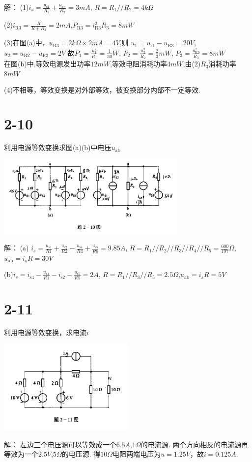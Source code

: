 \documentclass{article}
\begin{document}
\noindent 解：
(1)$i_s=\frac{u_\text{s1}}{R_1}+\frac{u_\text{s=}}{R_2}=3mA$,
$R=R_1//R_2=4k\Omega$

(2)$i_\text{R3}=\frac{R}{R+R_3}=2mA$,$P_\text{R3}=i_\text{R3}^2R_3=8mW$

(3)在图(a)中，$u_\text{R3}=2k\Omega\times2mA=4V$,则
$u_1=u_\text{s1}-u_\text{R3}=20V$,$u_2=u_\text{R2}-u_\text{R3}=2V$
故$P_1=\frac{u_1^2}{R_1}=\frac{1}{30}W$,
$P_2=\frac{u_2^2}{R_2}=\frac{2}{3}mW$,
$P_3=\frac{u_\text{R3}^2}{R_3}=8mW$\\
在图(b)中,等效电源发出功率$12mW$,等效电阻消耗功率$4mW$,由(2)$R_3$消耗功率$8mW$

(4)不相等，等效变换是对外部等效，被变换部分内部不一定等效.
\section*{2-10}
利用电源等效变换求图(a)(b)中电压$u_\text{ab}$
\begin{center}
\includegraphics[width=0.7\textwidth,height=0.2\textheight]{2-10.jpg}
\end{center}

\noindent 解：
(a)
$i_s=\frac{u_\text{s1}}{R1}+\frac{u_\text{s2}}{R2}
-\frac{u_\text{s4}}{R4}+\frac{u_\text{s5}}{R5}=9.85A$,
$R=R_1//R_2//R_3//R_4//R_5=\frac{600}{197}\Omega$,
$u_\text{ab}=i_sR=30V$

(b)$i_s=i_\text{s4}-\frac{u_\text{s1}}{R1}-i_\text{s2}-\frac{u_\text{s5}}{R5}=2A$,
$R=R_1//R_3//R_5=2.5\Omega$,$u_\text{ab}=i_sR=5V$
\section*{2-11}
利用电源等效变换，求电流$i$
\begin{center}
\includegraphics[width=0.5\textwidth,height=0.2\textheight]{2-11.jpg}
\end{center}
\noindent 解：
左边三个电压源可以等效成一个$6.5A$,$1\Omega$的电流源.
两个方向相反的电流源再等效为一个$2.5V$,$5\Omega$的电压源.
得$10\Omega$电阻两端电压为$u=1.25V$，故$i=0.125A$.
\end{document}

